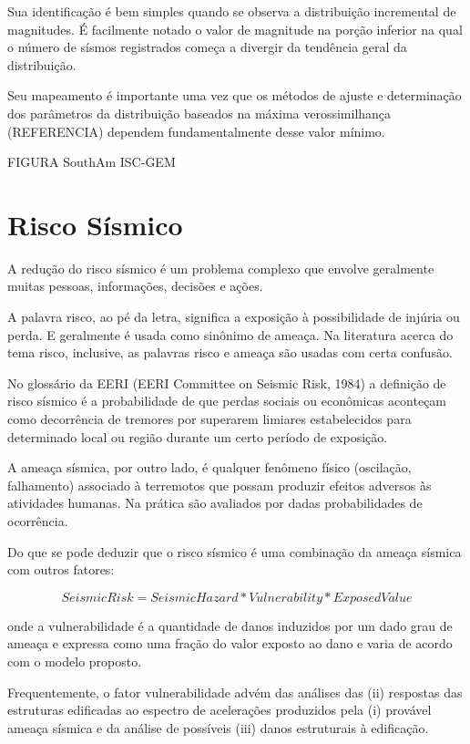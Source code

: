 Sua identificação é bem simples quando se observa a distribuição incremental de magnitudes. É facilmente notado o valor
de magnitude na porção inferior na qual o número de sísmos registrados começa a divergir da tendência geral da
distribuição.

Seu mapeamento é importante uma vez que os métodos de ajuste e determinação dos parâmetros da distribuição baseados na
máxima verossimilhança (REFERENCIA) dependem fundamentalmente desse valor mínimo.



FIGURA SouthAm ISC-GEM



\section{Risco Sísmico}
\label{sec:risco_sismico}

A redução do risco sísmico é um problema complexo que envolve geralmente muitas pessoas, informações, decisões e ações.

A palavra risco, ao pé da letra, significa a exposição à possibilidade de injúria ou perda. E geralmente é usada como
sinônimo de ameaça. Na literatura acerca do tema risco, inclusive, as palavras risco e ameaça são usadas com certa
confusão.

No glossário da EERI (EERI Committee on Seismic Risk, 1984) a definição de risco sísmico é a probabilidade de que
perdas sociais ou econômicas aconteçam como decorrência de tremores por superarem limiares estabelecidos para
determinado local ou região durante um certo período de exposição.

A ameaça sísmica, por outro lado, é qualquer fenômeno físico (oscilação, falhamento) associado à terremotos que possam
produzir efeitos adversos às atividades humanas. Na prática são avaliados por dadas probabilidades de ocorrência.

Do que se pode deduzir que o risco sísmico é uma combinação da ameaça sísmica com outros fatores:

\begin{equation}
		Seismic Risk = Seismic Hazard \ast Vulnerability \ast Exposed Value
	\label{eq:risk}
\end{equation}

onde a vulnerabilidade é a quantidade de danos induzidos por um dado grau de ameaça e expressa como uma fração do
valor exposto ao dano e varia de acordo com o modelo proposto.

Frequentemente, o fator vulnerabilidade advém das análises das (ii) respostas das estruturas edificadas ao espectro de
acelerações produzidos pela (i) provável ameaça sísmica e da análise de possíveis (iii) danos estruturais à edificação.

